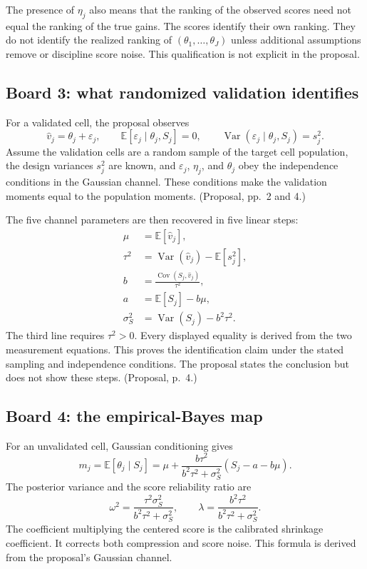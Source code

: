 \documentclass[11pt]{article}
\newcommand{\E}{\mathbb{E}}
\newcommand{\Var}{\operatorname{Var}}
\newcommand{\Cov}{\operatorname{Cov}}
\begin{document}
  The presence of \(\eta_j\) also means that the ranking of the observed scores
  need not equal the ranking of the true gains. The scores identify their own
  ranking. They do not identify the realized ranking of
  \((\theta_1,\ldots,\theta_J)\) unless additional assumptions remove or
  discipline score noise. This qualification is not explicit in the proposal.
  
  \subsection*{Board 3: what randomized validation identifies}
  
  For a validated cell, the proposal observes
  \[
      \widehat v_j=\theta_j+\varepsilon_j,
      \qquad
      \E[\varepsilon_j\mid\theta_j,S_j]=0,
      \qquad
      \Var(\varepsilon_j\mid\theta_j,S_j)=s_j^2.
  \]
  Assume the validation cells are a random sample of the target cell population,
  the design variances \(s_j^2\) are known, and \(\varepsilon_j\), \(\eta_j\), and
  \(\theta_j\) obey the independence conditions in the Gaussian channel. These
  conditions make the validation moments equal to the population moments.
  (Proposal, pp.~2 and 4.)
  
  The five channel parameters are then recovered in five linear steps:
  \begin{align*}
      \mu
      &=\E[\widehat v_j],\\
      \tau^2
      &=\Var(\widehat v_j)-\E[s_j^2],\\
      b
      &=\frac{\Cov(S_j,\widehat v_j)}
              {\tau^2},\\
      a
      &=\E[S_j]-b\mu,\\
      \sigma_S^2
      &=\Var(S_j)-b^2\tau^2.
  \end{align*}
  The third line requires \(\tau^2>0\). Every displayed equality is
  derived from the two measurement equations. This proves the identification
  claim under the stated sampling and independence conditions. The proposal
  states the conclusion but does not show these steps. (Proposal, p.~4.)
  
  \subsection*{Board 4: the empirical-Bayes map}
  
  For an unvalidated cell, Gaussian conditioning gives
  \[
      m_j
      =\E[\theta_j\mid S_j]
      =\mu+
        \frac{b\tau^2}
             {b^2\tau^2+\sigma_S^2}
        (S_j-a-b\mu).
  \]
  The posterior variance and the score reliability ratio are
  \[
      \omega^2
      =
      \frac{\tau^2\sigma_S^2}{b^2\tau^2+\sigma_S^2},
      \qquad
      \lambda
      =
      \frac{b^2\tau^2}{b^2\tau^2+\sigma_S^2}.
  \]
  The coefficient multiplying the centered score is the calibrated shrinkage
  coefficient. It corrects both compression and score noise. This formula is
  derived from the proposal's Gaussian channel.
  
\end{document}
